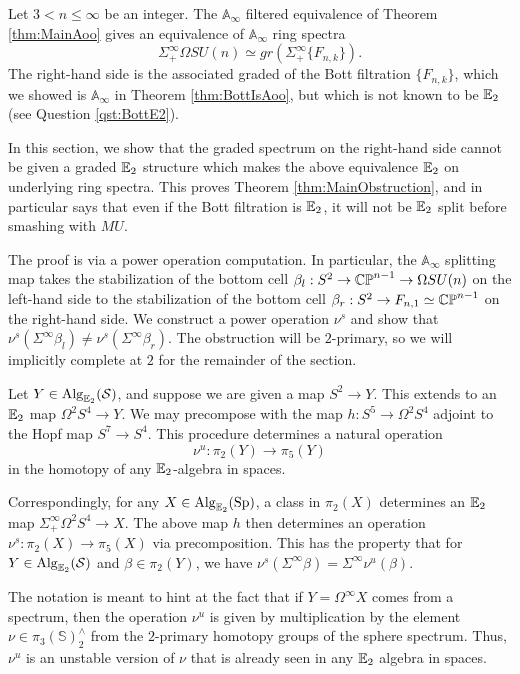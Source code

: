 

Let $3< n\leq \infty$ be an integer.  The $\mathbb{A}_{\infty}$ filtered equivalence of Theorem \ref{thm:MainAoo} gives an equivalence of $\mathbb{A}_\infty$ ring spectra  $$\Sigma^{\infty}_+ \Omega SU(n) \simeq gr(\Sigma^{\infty}_+ \{ F_{n,k} \}).$$  The right-hand side is the associated graded of the Bott filtration $\{ F_{n,k} \}$, which we showed is $\mathbb{A}_\infty$ in Theorem \ref{thm:BottIsAoo}, but which is not known to be $\operatorname{\mathbb{E}}_2$ (see Question \ref{qst:BottE2}).

In this section, we show that the graded spectrum on the right-hand side cannot be given a graded $\operatorname{\mathbb{E}}_2$ structure which makes the above equivalence $\operatorname{\mathbb{E}}_2$ on underlying ring spectra.  This proves Theorem \ref{thm:MainObstruction}, and in particular says that even if the Bott filtration is $\operatorname{\mathbb{E}}_2$, it will not be $\operatorname{\mathbb{E}}_2$ split before smashing with $MU$.

The proof is via a power operation computation.  In particular, the $\mathbb{A}_\infty$ splitting map takes the stabilization of the bottom cell $\beta_l : S^2 \to  \operatorname{\mathbb{CP}}^{n-1} \to \Omega SU(n)$ on the left-hand side to the stabilization of the bottom cell $\beta_r: S^2 \to F_{n,1} \simeq \operatorname{\mathbb{CP}}^{n-1}$ on the right-hand side.  We construct a power operation $\nu^{s}$ and show that $\nu^{s}(\Sigma^{\infty} \beta_l) \neq \nu^s(\Sigma^{\infty} \beta_r).$  The obstruction will be $2$-primary, so we will implicitly complete at $2$ for the remainder of the section.  

\begin{obs}Let $Y\in \operatorname{\mathrm{Alg}}_{\operatorname{\mathbb{E}}_2}(\operatorname{\mathcal{S}})$, and suppose we are given a map $S^2\to Y$.  This extends to an $\operatorname{\mathbb{E}}_2$ map $\Omega^2 S^4 \to Y.$  We may precompose with the map $h: S^5 \to \Omega^2 S^4$ adjoint to the Hopf map $S^7\to S^4$.  This procedure determines a natural operation $$\nu^u: \pi_2(Y) \to \pi_5(Y)$$ in the homotopy of any $\operatorname{\mathbb{E}}_2$-algebra in spaces.  

Correspondingly, for any $X\in \operatorname{\mathrm{Alg}}_{\operatorname{\mathbb{E}}_2}(\operatorname{\mathrm{Sp}})$, a class in $\pi_2(X)$ determines an $\operatorname{\mathbb{E}}_2$ map $\Sigma^{\infty}_+ \Omega^2 S^4 \to X$.  The above map $h$ then determines an operation $\nu^s :\pi_2(X) \to \pi_5(X)$ via precomposition.  This has the property that for $Y\in \operatorname{\mathrm{Alg}}_{\operatorname{\mathbb{E}}_2}(\operatorname{\mathcal{S}})$ and $\beta \in \pi_2(Y)$, we have $\nu^s(\Sigma^{\infty} \beta) = \Sigma^{\infty} \nu^u (\beta).$
\end{obs}

\begin{rmk} \label{rmk:multnu}
The notation is meant to hint at the fact that if $Y = \Omega^\infty X$ comes from a spectrum, then the operation $\nu^u$ is given by multiplication by the element $\nu \in \pi_3(\mathbb{S})^{\wedge}_2$ from the $2$-primary homotopy groups of the sphere spectrum.  Thus, $\nu^u$ is an unstable version of $\nu$ that is already seen in any $\operatorname{\mathbb{E}}_2$ algebra in spaces.    %
\end{rmk}

